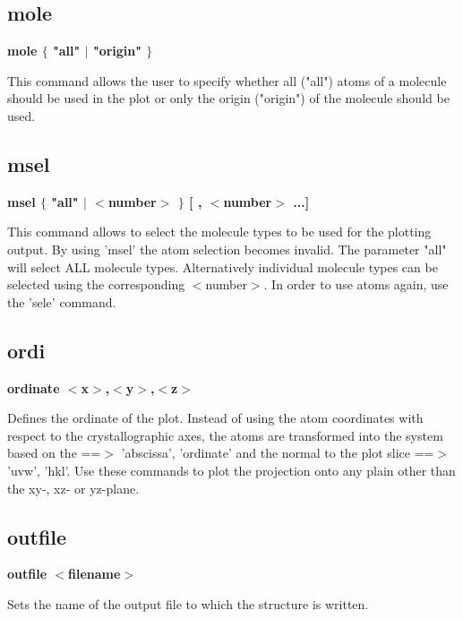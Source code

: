 \subsection*{mole}
{\bf mole $ \{$ "all" $| $ "origin" $\} $ \par }
\par
\vspace{3pt}
This command allows the user to specify whether all ("all") atoms 
of a molecule should be used in the plot or only the origin 
("origin") of the molecule should be used. 
\subsection*{msel}
{\bf msel $ \{$ "all" $| $ $ <$number$> $ $\} $ [ , $ <$number$> $ ...] \par }
\par
\vspace{3pt}
This command allows to select the molecule types to be used for 
the plotting output. By using 'msel' the atom selection becomes 
invalid. The parameter "all" will select ALL molecule types. 
Alternatively individual molecule types can be selected using the 
corresponding $ <$number$> $. In order to use atoms again, use the 'sele' 
command. 
\subsection*{ordi}
{\bf ordinate $ <$x$> $,$ <$y$> $,$ <$z$> $ \par }
\par
\vspace{3pt}
Defines the ordinate of the plot. 
Instead of using the atom coordinates with respect to the crystallographic 
axes, the atoms are transformed into the system based on the ==$> $ 'abscissa', 
'ordinate' and the normal to the plot slice ==$> $ 'uvw', 'hkl'. 
Use these commands to plot the projection onto any plain other than the 
xy-, xz- or yz-plane. 
\subsection*{outfile}
{\bf outfile $ <$filename$> $ \par }
\par
\vspace{3pt}
Sets the name of the output file to which the structure is written. 
